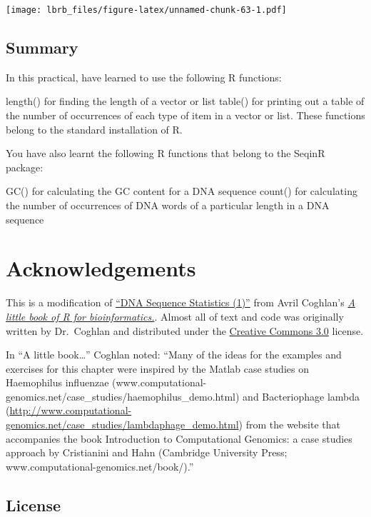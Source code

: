 \documentclass[
]{book}
\begin{document}
\texttt{[image: lbrb\_files/figure-latex/unnamed-chunk-63-1.pdf]}

\hypertarget{summary}{%
\subsection{Summary}\label{summary}}

In this practical, have learned to use the following R functions:

length() for finding the length of a vector or list
table() for printing out a table of the number of occurrences of each type of item in a vector or list.
These functions belong to the standard installation of R.

You have also learnt the following R functions that belong to the SeqinR package:

GC() for calculating the GC content for a DNA sequence
count() for calculating the number of occurrences of DNA words of a particular length in a DNA sequence

\hypertarget{acknowledgements}{%
\section{Acknowledgements}\label{acknowledgements}}

This is a modification of \href{https://a-little-book-of-r-for-bioinformatics.readthedocs.io/en/latest/src/chapter1.html}{``DNA Sequence Statistics (1)''} from Avril Coghlan's \href{https://a-little-book-of-r-for-bioinformatics.readthedocs.io/en/latest/index.html}{\emph{A little book of R for bioinformatics.}}. Almost all of text and code was originally written by Dr.~Coghlan and distributed under the \href{https://creativecommons.org/licenses/by/3.0/us/}{Creative Commons 3.0} license.

In ``A little book\ldots{}'' Coghlan noted: ``Many of the ideas for the examples and exercises for this chapter were inspired by the Matlab case studies on Haemophilus influenzae (www.computational-genomics.net/case\_studies/haemophilus\_demo.html) and Bacteriophage lambda (\url{http://www.computational-genomics.net/case_studies/lambdaphage_demo.html}) from the website that accompanies the book Introduction to Computational Genomics: a case studies approach by Cristianini and Hahn (Cambridge University Press; www.computational-genomics.net/book/).''

\hypertarget{license}{%
\subsection{License}\label{license}}
\end{document}
